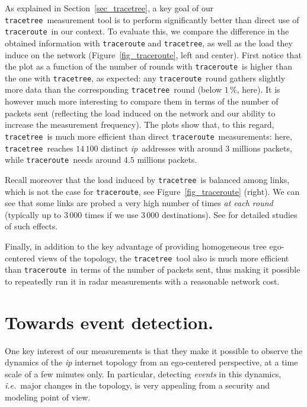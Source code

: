 \documentclass[times, 10pt,twocolumn]{article}
\newcommand{\ie}{{\em i.e.}}
\newcommand{\traceroute}{{\tt trace\-route}}
\newcommand{\tracetree}{{\tt trace\-tree}}
\newcommand{\ip}{\mbox{\em \sc ip}}
\begin{document}
As explained in Section~\ref{sec_tracetree}, a key goal of our
\tracetree\ measurement tool is to perform significantly better than
direct use of \traceroute\ in our context.
To evaluate this, we compare the difference in the obtained information
with \traceroute{} and \tracetree{}, 
as well as the load they induce on the network (Figure~\ref{fig_traceroute}, left and center).
First notice that the plot as a function of the number of rounds with \traceroute\ is higher than the one with \tracetree, as expected: any \traceroute\ round gathers slightly more data than the corresponding \tracetree\ round (below $1\,\%$, here).
It is however much more interesting to compare them in terms of the number of packets sent (reflecting the load induced on the network and our ability to increase the measurement frequency). The plots show that, to this regard, \tracetree\ is much more efficient than direct \traceroute\ measurements: here, \tracetree\ reaches $14\,100$ distinct \ip\ addresses with around $3$ millions packets, while \traceroute\ needs around $4.5$ millions packets.

Recall moreover that the load induced by \tracetree\ is balanced among links,
which is not the case for \traceroute{}, see Figure~\ref{fig_traceroute} (right).
We can see that some links are probed a very high number of times {\em at each round}
(typically up to $3\,000$ times if we use $3\,000$ destinations).
See \cite{DTJSAC,DTSigmetrics,probingScheme} for detailed studies of such effects.

Finally, in addition to the key advantage of providing homogeneous tree ego-centered views of the topology, the \tracetree\ tool also is much more efficient than \traceroute\ in terms of the number of packets sent, thus making it possible to repeatedly run it in radar measurements
with a reasonable network cost.



\section{Towards event detection.}
\label{sec_event}

One key interest of our measurements is that they make it possible to
observe the dynamics of the \ip{} internet topology from an ego-centered
perspective, at a time scale of a few minutes only.
In
particular, detecting {\em events} in this dynamics, \ie\ major
changes in the topology, is very appealing from a security and
modeling point of view.
\end{document}
